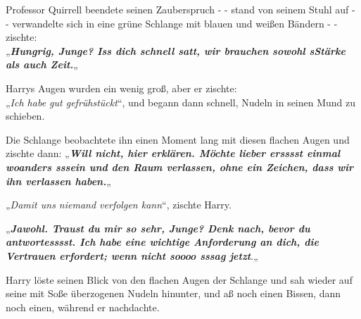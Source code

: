 {Professor Quirrell beendete seinen Zauberspruch - - stand von seinem Stuhl auf - - verwandelte sich in eine grüne Schlange mit blauen und weißen Bändern - - zischte:\\ „\textbf{\emph{Hungrig, Junge? Iss dich schnell satt, wir brauchen sowohl sStärke als auch Zeit.}}„

Harrys Augen wurden ein wenig groß, aber er zischte:\\ „\emph{Ich habe gut gefrühstückt}“, und begann dann schnell, Nudeln in seinen Mund zu schieben.

Die Schlange beobachtete ihn einen Moment lang mit diesen flachen Augen und zischte dann: „\textbf{\emph{Will nicht, hier erklären. Möchte lieber ersssst einmal woanders sssein und den Raum verlassen, ohne ein Zeichen, dass wir ihn verlassen haben.}}„

„\emph{Damit uns niemand verfolgen kann}“, zischte Harry.

„\textbf{\emph{Jawohl. Traust du mir so sehr, Junge? Denk nach, bevor du antwortesssst. Ich habe eine wichtige Anforderung an dich, die Vertrauen erfordert; wenn nicht soooo sssag jetzt}}.„

Harry löste seinen Blick von den flachen Augen der Schlange und sah wieder auf seine mit Soße überzogenen Nudeln hinunter, und aß noch einen Bissen, dann noch einen, während er nachdachte.

}
